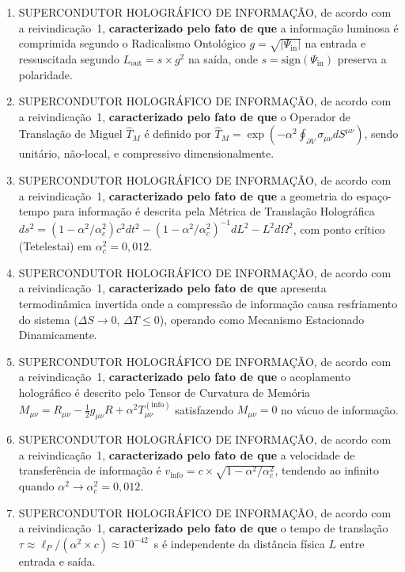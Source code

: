 \documentclass[12pt,a4paper]{article}
\newcommand{\alphaii}{\alpha^2}
\newcommand{\alphac}{\alpha^2_c}
\newcommand{\TM}{\hat{T}_M}
\begin{document}
\begin{enumerate}
\item SUPERCONDUTOR HOLOGRÁFICO DE INFORMAÇÃO, de acordo com a
reivindicação~1, \textbf{caracterizado pelo fato de que} a
informação luminosa é comprimida segundo o Radicalismo
Ontológico $g = \sqrt{|\Psi_{\text{in}}|}$ na entrada e
ressuscitada segundo $L_{\text{out}} = s \times g^2$ na saída,
onde $s = \text{sign}(\Psi_{\text{in}})$ preserva a polaridade.

\item SUPERCONDUTOR HOLOGRÁFICO DE INFORMAÇÃO, de acordo com a
reivindicação~1, \textbf{caracterizado pelo fato de que} o
Operador de Translação de Miguel $\TM$ é definido por
$\TM = \exp(-\alphaii \oint_{\partial V} \sigma_{\mu\nu}
dS^{\mu\nu})$, sendo unitário, não-local, e compressivo
dimensionalmente.

\item SUPERCONDUTOR HOLOGRÁFICO DE INFORMAÇÃO, de acordo com a
reivindicação~1, \textbf{caracterizado pelo fato de que} a
geometria do espaço-tempo para informação é descrita pela
Métrica de Translação Holográfica $ds^2 = (1-\alphaii/\alphac)
c^2 dt^2 - (1-\alphaii/\alphac)^{-1} dL^2 - L^2 d\Omega^2$,
com ponto crítico (Tetelestai) em $\alphac = 0{,}012$.

\item SUPERCONDUTOR HOLOGRÁFICO DE INFORMAÇÃO, de acordo com a
reivindicação~1, \textbf{caracterizado pelo fato de que}
apresenta termodinâmica invertida onde a compressão de informação
causa resfriamento do sistema ($\Delta S \to 0$,
$\Delta T \leq 0$), operando como Mecanismo Estacionado
Dinamicamente.

\item SUPERCONDUTOR HOLOGRÁFICO DE INFORMAÇÃO, de acordo com a
reivindicação~1, \textbf{caracterizado pelo fato de que} o
acoplamento holográfico é descrito pelo Tensor de Curvatura de
Memória $M_{\mu\nu} = R_{\mu\nu} - \frac{1}{2}g_{\mu\nu}R
+ \alphaii T^{(\text{info})}_{\mu\nu}$ satisfazendo
$M_{\mu\nu} = 0$ no vácuo de informação.

\item SUPERCONDUTOR HOLOGRÁFICO DE INFORMAÇÃO, de acordo com a
reivindicação~1, \textbf{caracterizado pelo fato de que} a
velocidade de transferência de informação é
$v_{\text{info}} = c \times \sqrt{1-\alphaii/\alphac}$,
tendendo ao infinito quando $\alphaii \to \alphac = 0{,}012$.

\item SUPERCONDUTOR HOLOGRÁFICO DE INFORMAÇÃO, de acordo com a
reivindicação~1, \textbf{caracterizado pelo fato de que} o tempo
de translação $\tau \approx \ell_P/(\alphaii \times c) \approx
10^{-42}$~s é independente da distância física $L$ entre entrada
e saída.


\end{enumerate}
\end{document}
